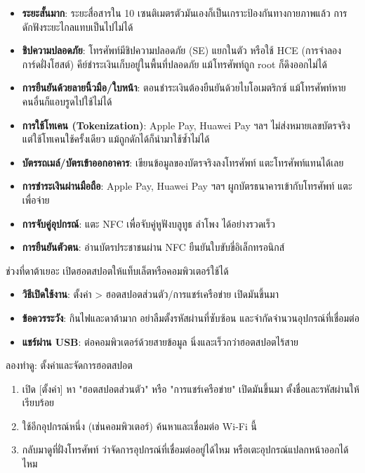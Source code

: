 \begin{itemize}
  \item \textbf{ระยะสั้นมาก}: ระยะสื่อสารใน 10 เซนติเมตรตัวมันเองก็เป็นเกราะป้องกันทางกายภาพแล้ว การดักฟังระยะไกลแทบเป็นไปไม่ได้
  \item \textbf{ชิปความปลอดภัย}: โทรศัพท์มีชิปความปลอดภัย (SE) แยกในตัว หรือใช้ HCE (การจำลองการ์ดฝั่งโฮสต์) คีย์ชำระเงินเก็บอยู่ในพื้นที่ปลอดภัย แม้โทรศัพท์ถูก root ก็ดึงออกไม่ได้
  \item \textbf{การยืนยันด้วยลายนิ้วมือ/ใบหน้า}: ตอนชำระเงินต้องยืนยันด้วยไบโอเมตริกซ์ แม้โทรศัพท์หาย คนอื่นก็แอบรูดไปใช้ไม่ได้
  \item \textbf{การใช้โทเคน (Tokenization)}: Apple Pay, Huawei Pay ฯลฯ ไม่ส่งหมายเลขบัตรจริง แต่ใช้โทเคนใช้ครั้งเดียว แม้ถูกดักได้ก็นำมาใช้ซ้ำไม่ได้
\end{itemize}


\begin{itemize}
  \item \textbf{บัตรรถเมล์/บัตรเข้าออกอาคาร}: เขียนข้อมูลของบัตรจริงลงโทรศัพท์ แตะโทรศัพท์แทนได้เลย
  \item \textbf{การชำระเงินผ่านมือถือ}: Apple Pay, Huawei Pay ฯลฯ ผูกบัตรธนาคารเข้ากับโทรศัพท์ แตะเพื่อจ่าย
  \item \textbf{การจับคู่อุปกรณ์}: แตะ NFC เพื่อจับคู่หูฟังบลูทูธ ลำโพง ได้อย่างรวดเร็ว
  \item \textbf{การยืนยันตัวตน}: อ่านบัตรประชาชนผ่าน NFC ยืนยันใบขับขี่อิเล็กทรอนิกส์
\end{itemize}


ช่วงที่ดาต้าเยอะ เปิดฮอตสปอตให้แท็บเล็ตหรือคอมพิวเตอร์ใช้ได้

\begin{itemize}
  \item \textbf{วิธีเปิดใช้งาน}: ตั้งค่า > ฮอตสปอตส่วนตัว/การแชร์เครือข่าย เปิดมันขึ้นมา
  \item \textbf{ข้อควรระวัง}: กินไฟและดาต้ามาก อย่าลืมตั้งรหัสผ่านที่ซับซ้อน และจำกัดจำนวนอุปกรณ์ที่เชื่อมต่อ
  \item \textbf{แชร์ผ่าน USB}: ต่อคอมพิวเตอร์ด้วยสายข้อมูล นิ่งและเร็วกว่าฮอตสปอตไร้สาย
\end{itemize}

\begin{tcbpractice}{ลองทำดู: ตั้งค่าและจัดการฮอตสปอต}
\begin{enumerate}
  \item เปิด [ตั้งค่า] หา "ฮอตสปอตส่วนตัว" หรือ "การแชร์เครือข่าย" เปิดมันขึ้นมา ตั้งชื่อและรหัสผ่านให้เรียบร้อย
  \item ใช้อีกอุปกรณ์หนึ่ง (เช่นคอมพิวเตอร์) ค้นหาและเชื่อมต่อ Wi-Fi นี้
  \item กลับมาดูที่ฝั่งโทรศัพท์ ว่าจัดการอุปกรณ์ที่เชื่อมต่ออยู่ได้ไหม หรือเตะอุปกรณ์แปลกหน้าออกได้ไหม
\end{enumerate}

\end{tcbpractice}

